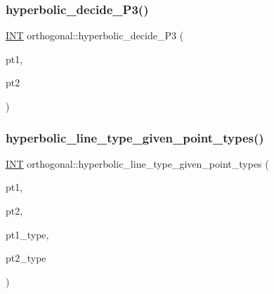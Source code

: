 \subsubsection{\texorpdfstring{hyperbolic\+\_\+decide\+\_\+\+P3()}{hyperbolic\_decide\_P3()}}
{\footnotesize\ttfamily \mbox{\hyperlink{galois_8h_a09fddde158a3a20bd2dcadb609de11dc}{I\+NT}} orthogonal\+::hyperbolic\+\_\+decide\+\_\+\+P3 (\begin{DoxyParamCaption}\item[{\mbox{\hyperlink{galois_8h_a09fddde158a3a20bd2dcadb609de11dc}{I\+NT}}}]{pt1,  }\item[{\mbox{\hyperlink{galois_8h_a09fddde158a3a20bd2dcadb609de11dc}{I\+NT}}}]{pt2 }\end{DoxyParamCaption})}

\mbox{\label{classorthogonal_a15c1b4ccef6201476a9f7618e642eada}} 
\subsubsection{\texorpdfstring{hyperbolic\+\_\+line\+\_\+type\+\_\+given\+\_\+point\+\_\+types()}{hyperbolic\_line\_type\_given\_point\_types()}}
{\footnotesize\ttfamily \mbox{\hyperlink{galois_8h_a09fddde158a3a20bd2dcadb609de11dc}{I\+NT}} orthogonal\+::hyperbolic\+\_\+line\+\_\+type\+\_\+given\+\_\+point\+\_\+types (\begin{DoxyParamCaption}\item[{\mbox{\hyperlink{galois_8h_a09fddde158a3a20bd2dcadb609de11dc}{I\+NT}}}]{pt1,  }\item[{\mbox{\hyperlink{galois_8h_a09fddde158a3a20bd2dcadb609de11dc}{I\+NT}}}]{pt2,  }\item[{\mbox{\hyperlink{galois_8h_a09fddde158a3a20bd2dcadb609de11dc}{I\+NT}}}]{pt1\+\_\+type,  }\item[{\mbox{\hyperlink{galois_8h_a09fddde158a3a20bd2dcadb609de11dc}{I\+NT}}}]{pt2\+\_\+type }\end{DoxyParamCaption})}

\mbox{\label{classorthogonal_aad0a2a87d54b571f0d6581dec4d59eab}} 

